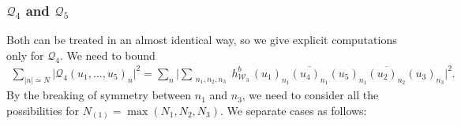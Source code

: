 \documentclass[11pt, xcolor = dvipsnames,reqno
]{amsart}
\theoremstyle{definition}
\theoremstyle{remark}
\begin{document}
    \subsubsection{$\mathcal Q_4$ and $\mathcal{Q}_5$}\label{subsec:eq:3pairings-n1n4n5}
    Both can be treated in an almost identical way, so we give explicit computations only for $\mathcal{Q}_4$. We need to bound
   	\begin{align}\label{eq:3pairings-n1n2n3}
        \sum_{|n| \simeq N}  \big| \mathcal{Q}_4(u_1, \ldots, u_5)_n \big|^2
        = \sum_n \bigg| \sum_{\substack{ n_1, n_2, n_3 }} h^b_{\mathcal{W}_3} \, (u_1)_{n_1}  \overline{(u_4)_{n_1}} (u_5)_{n_1}  \overline{(u_2)_{n_2}} (u_3)_{n_3} \bigg|^2.
   	\end{align}
    By the breaking of symmetry between $n_1$ and $n_3$, we need to consider all the possibilities for $N_{(1)} = \max (N_1, N_2, N_3)$. 
    We separate cases as follows:
\end{document}

